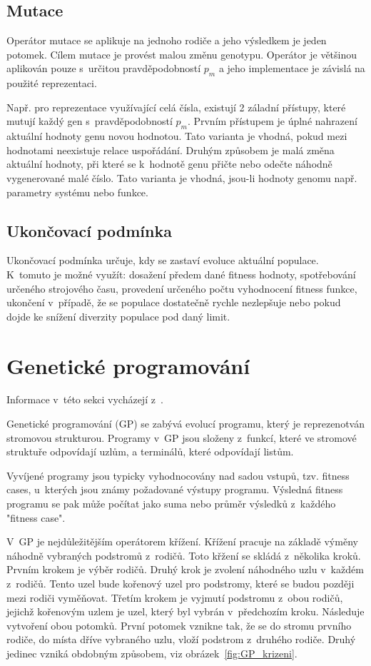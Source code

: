 \subsection{Mutace}
Operátor mutace se aplikuje na jednoho rodiče a jeho výsledkem je jeden potomek.
Cílem mutace je provést malou změnu genotypu.
Operátor je většinou aplikován pouze s~určitou pravděpodobností $p_m$ a jeho implementace je závislá na použité reprezentaci.


Např. pro reprezentace využívající celá čísla, existují 2 záladní přístupy, které mutují každý gen s~pravděpodobností $p_m$.
Prvním přístupem je úplné nahrazení aktuální hodnoty genu novou hodnotou.
Tato varianta je vhodná, pokud mezi hodnotami neexistuje relace uspořádání.
Druhým způsobem je malá změna aktuální hodnoty, při které se k~hodnotě genu přičte nebo odečte náhodně vygenerované malé číslo.
Tato varianta je vhodná, jsou-li hodnoty genomu např. parametry systému nebo funkce.

\subsection{Ukončovací podmínka}
Ukončovací podmínka určuje, kdy se zastaví evoluce aktuální populace.
K~tomuto je možné využít: dosažení předem dané fitness hodnoty, spotřebování určeného strojového času, provedení určeného počtu vyhodnocení fitness funkce, ukončení v~případě, že se populace dostatečně rychle nezlepšuje nebo pokud dojde ke snížení diverzity populace pod daný limit.

\section{Genetické programování}
\label{sec:gp}

Informace v~této sekci vycházejí z~\cite{Koza1992}.

Genetické programování (GP) se zabývá evolucí programu, který je reprezenotván stromovou strukturou.
Programy v~GP jsou složeny z~funkcí, které ve stromové struktuře odpovídají uzlům, a terminálů, které odpovídají listům.

Vyvíjené programy jsou typicky vyhodnocovány nad sadou vstupů, tzv. fitness cases, u~kterých jsou známy požadované výstupy programu.
Výsledná fitness programu se pak může počítat jako suma nebo průměr výsledků z~každého "fitness case".

V~GP je nejdůležitějším operátorem křížení.
Křížení pracuje na základě výměny náhodně vybraných podstromů z~rodičů.
Toto křžení se skládá z~několika kroků.
Prvním krokem je výběr rodičů.
Druhý krok je zvolení náhodného uzlu v~každém z~rodičů.
Tento uzel bude kořenový uzel pro podstromy, které se budou později mezi rodiči vyměňovat.
Třetím krokem je vyjmutí podstromu z~obou rodičů, jejichž kořenovým uzlem je uzel, který byl vybrán v~předchozím kroku.
Následuje vytvoření obou potomků.
První potomek vznikne tak, že se do stromu prvního rodiče, do místa dříve vybraného uzlu, vloží podstrom z~druhého rodiče.
Druhý jedinec vzniká obdobným způsobem, viz obrázek~\ref{fig:GP_krizeni}.


